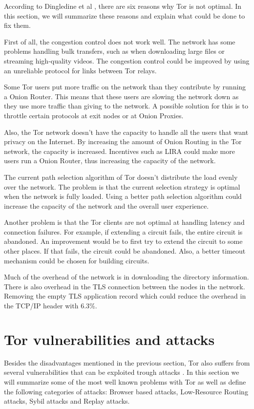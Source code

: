 \documentclass[journal]{IEEEtran}
\begin{document}
		According to Dingledine et al \cite{dingledine2009performance}, there are six reasons why Tor is not optimal. In this section, we will summarize these reasons and explain what could be done to fix them.
		
		First of all, the congestion control does not work well. The network has some problems handling bulk transfers, such as when downloading large files or streaming high-quality videos. The congestion control could be improved by using an unreliable protocol for links between Tor relays.		
		
		Some Tor users put more traffic on the network than they contribute by running a Onion Router. This means that these users are slowing the network down as they use more traffic than giving to the network. A possible solution for this is to throttle certain protocols at exit nodes or at Onion Proxies.
		
		Also, the Tor network doesn't have the capacity to handle all the users that want privacy on the Internet. By increasing the amount of Onion Routing in the Tor network, the capacity is increased. Incentives such as LIRA \cite{jansen13lira} could make more users run a Onion Router, thus increasing the capacity of the network.		
		
		The current path selection algorithm of Tor doesn't distribute the load evenly over the network. The problem is that the current selection strategy is optimal when the network is fully loaded. Using a better path selection algorithm could increase the capacity of the network and the overall user experience.		
		
		Another problem is that the Tor clients are not optimal at handling latency and connection failures. For example, if extending a circuit fails, the entire circuit is abandoned. An improvement would be to first try to extend the circuit to some other places. If that fails, the circuit could be abandoned. Also, a better timeout mechanism could be chosen for building circuits.		
		
		Much of the overhead of the network is in downloading the directory information. There is also overhead in the TLS connection between the nodes in the network. Removing the empty TLS application record which could reduce the overhead in the TCP/IP header with 6.3\%.
		
	\section{Tor vulnerabilities and attacks}
Besides the disadvantages mentioned in the previous section, Tor also suffers from several vulnerabilities that can be exploited trough attacks \cite{abbott2007browser, douceur2002sybil, bauer2007low}. In this section we will summarize some of the most well known problems with Tor as well as define the following categories of attacks: Browser based attacks, Low-Resource Routing attacks, Sybil attacks and Replay attacks.
\end{document}
